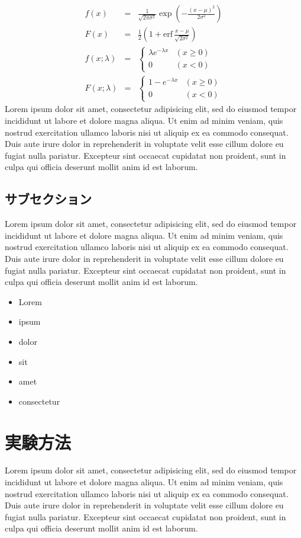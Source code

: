 \documentclass[a4j,10pt, twocolumn]{jarticle}
\begin{document}
\begin{eqnarray*}
f(x)&=&\frac{1}{\sqrt{2\pi\sigma^{2}}} \exp\!\left(-\frac{(x-\mu)^2}{2\sigma^2} \right) \\
F(x)&=&\frac12 \left(1 + \mathrm{erf}\,\frac{x-\mu}{\sqrt{2\sigma^{2} } }\right) \\
f(x; \lambda) &=& \left\{ \begin{array}{ll} \lambda e^{-\lambda x} & (x \geq 0) \\ 0 & (x < 0)\end{array}\right.  \\
F(x; \lambda) &=& \left\{ \begin{array}{ll} 1 - e^{-\lambda x} & (x \geq 0) \\ 0 & (x < 0)\end{array}\right.
\end{eqnarray*}
Lorem ipsum dolor sit amet, consectetur adipisicing elit, sed do eiusmod tempor incididunt ut labore et dolore magna aliqua. Ut enim ad minim veniam, quis nostrud exercitation ullamco laboris nisi ut aliquip ex ea commodo consequat. Duis aute irure dolor in reprehenderit in voluptate velit esse cillum dolore eu fugiat nulla pariatur. Excepteur sint occaecat cupidatat non proident, sunt in culpa qui officia deserunt mollit anim id est laborum.

\subsection{サブセクション}
Lorem ipsum dolor sit amet, consectetur adipisicing elit, sed do eiusmod tempor incididunt ut labore et dolore magna aliqua. Ut enim ad minim veniam, quis nostrud exercitation ullamco laboris nisi ut aliquip ex ea commodo consequat. Duis aute irure dolor in reprehenderit in voluptate velit esse cillum dolore eu fugiat nulla pariatur. Excepteur sint occaecat cupidatat non proident, sunt in culpa qui officia deserunt mollit anim id est laborum.
\begin{itemize}
\item Lorem
\item ipsum
\item dolor
\item sit
\item amet
\item consectetur
\end{itemize}
\section{実験方法}
Lorem ipsum dolor sit amet, consectetur adipisicing elit, sed do eiusmod tempor incididunt ut labore et dolore magna aliqua. Ut enim ad minim veniam, quis nostrud exercitation ullamco laboris nisi ut aliquip ex ea commodo consequat. Duis aute irure dolor in reprehenderit in voluptate velit esse cillum dolore eu fugiat nulla pariatur. Excepteur sint occaecat cupidatat non proident, sunt in culpa qui officia deserunt mollit anim id est laborum.
\end{document}
